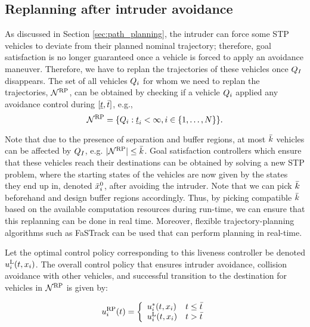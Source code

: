\subsection{Replanning after intruder avoidance} \label{sec:replan}
As discussed in Section \ref{sec:path_planning}, the intruder can force some STP vehicles to deviate from their planned nominal trajectory; therefore, goal satisfaction is no longer guaranteed once a vehicle is forced to apply an avoidance maneuver. Therefore, we have to replan the trajectories of these vehicles once $Q_{I}$ disappears. The set of all vehicles $Q_i$ for whom we need to replan the trajectories, $\mathcal{N}^\text{RP}$, can be obtained by checking if a vehicle $Q_i$ applied any avoidance control during $[\underline{t}, \bar{t}]$, e.g.,
\begin{equation} \label{eq:RVS}
\rvs = \{\veh_i: \tsa_i < \infty, i \in \{1, \ldots, \N \} \}. 
\end{equation}  

Note that due to the presence of separation and buffer regions, at most $\bar{k}$ vehicles can be affected by $Q_{I}$, e.g. $|\mathcal{N}^\text{RP}| \leq \bar{k}$. Goal satisfaction controllers which ensure that these vehicles reach their destinations can be obtained by solving a new STP problem, where the starting states of the vehicles are now given by the states they end up in, denoted $\tilde{x}_i^0$, after avoiding the intruder. Note that we can pick $\bar{k}$ beforehand and design buffer regions accordingly. Thus, by picking compatible $\bar{k}$ based on the available computation resources during run-time, we can ensure that this replanning can be done in real time. Moreover, flexible trajectory-planning algorithms such as FaSTrack \cite{herbert2017fastrack} can be used that can perform planning in real-time.   

Let the optimal control policy corresponding to this liveness controller be denoted ${u^{\text{L}}_{i}}(t, x_i)$. The overall control policy that ensures intruder avoidance, collision avoidance with other vehicles, and successful transition to the destination for vehicles in $\mathcal{N}^\text{RP}$ is given by:

\begin{equation} \label{eqn:full_controller}
\ctrl_i^{\text{RP}}(t) = 
\left \{ 
\begin{array}{ll}
{\ctrl^*_{i}}(t, \state_i) & t \leq \tea\\
{\ctrl^{\text{L}}_{i}}(t, \state_i) & t > \tea
\end{array}
\right.
\end{equation}

